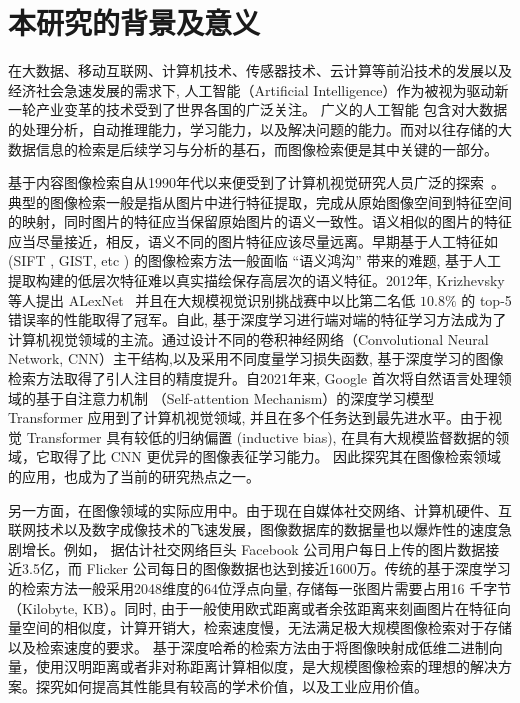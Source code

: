 \section{本研究的背景及意义}
在大数据、移动互联网、计算机技术、传感器技术、云计算等前沿技术的发展以及经济社会急速发展的需求下, 人工智能（Artificial Intelligence）作为被视为驱动新一轮产业变革的技术受到了世界各国的广泛关注。 广义的人工智能\cite{russell2010artificial} 包含对大数据的处理分析，自动推理能力，学习能力，以及解决问题的能力。而对以往存储的大数据信息的检索是后续学习与分析的基石，而图像检索便是其中关键的一部分。 \par
基于内容图像检索自从1990年代以来便受到了计算机视觉研究人员广泛的探索~\cite{zhou2017recent}。典型的图像检索一般是指从图片中进行特征提取，完成从原始图像空间到特征空间的映射，同时图片的特征应当保留原始图片的语义一致性。语义相似的图片的特征应当尽量接近，相反，语义不同的图片特征应该尽量远离。早期基于人工特征如 (SIFT , GIST, etc ) 的图像检索方法一般面临 ``语义鸿沟'' \cite{li2016socializing} 带来的难题, 基于人工提取构建的低层次特征难以真实描绘保存高层次的语义特征。2012年, Krizhevsky 等人提出 ALexNet~\cite{krizhevsky2017imagenet} 并且在大规模视觉识别挑战赛中以比第二名低 $10.8\%$ 的 top-5 错误率的性能取得了冠军。自此, 基于深度学习进行端对端的特征学习方法成为了计算机视觉领域的主流。通过设计不同的卷积神经网络（Convolutional Neural Network, CNN）主干结构,以及采用不同度量学习损失函数, 基于深度学习的图像检索方法取得了引人注目的精度提升。自2021年来, Google 首次将自然语言处理领域的基于自注意力机制 （Self-attention Mechanism）的深度学习模型 Transformer 应用到了计算机视觉领域, 并且在多个任务达到最先进水平。由于视觉 Transformer 具有较低的归纳偏置 (inductive bias), 在具有大规模监督数据的领域，它取得了比 CNN 更优异的图像表征学习能力。 因此探究其在图像检索领域的应用，也成为了当前的研究热点之一。  \par
另一方面，在图像领域的实际应用中。由于现在自媒体社交网络、计算机硬件、互联网技术以及数字成像技术的飞速发展，图像数据库的数据量也以爆炸性的速度急剧增长。例如， 据估计社交网络巨头 Facebook 公司用户每日上传的图片数据接近3.5亿，而 Flicker 公司每日的图像数据也达到接近1600万。传统的基于深度学习的检索方法一般采用2048维度的64位浮点向量, 存储每一张图片需要占用16 千字节 （Kilobyte, KB）。同时, 由于一般使用欧式距离或者余弦距离来刻画图片在特征向量空间的相似度，计算开销大，检索速度慢，无法满足极大规模图像检索对于存储以及检索速度的要求。 基于深度哈希的检索方法由于将图像映射成低维二进制向量，使用汉明距离或者非对称距离计算相似度，是大规模图像检索的理想的解决方案。探究如何提高其性能具有较高的学术价值，以及工业应用价值。\par
